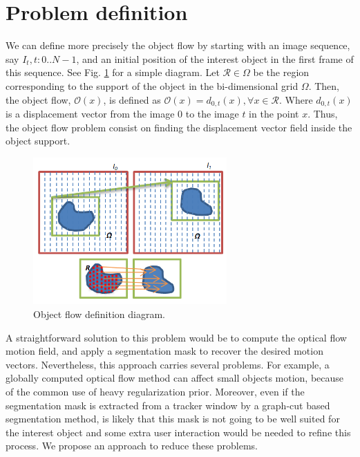 \section{Problem definition}

We can define more precisely the object flow by starting with an image sequence, say $I_t, t:0..N-1$, and an initial 
position of the interest object in the first frame of this sequence. See Fig. \ref{diagram} for a simple diagram. Let $\mathcal{R} \in \Omega$ be the region corresponding to the support of the object in the
bi-dimensional grid $\Omega$. Then, the object flow, $\mathcal{O}(x)$,  is defined as $\mathcal{O}(x) = d_{0,t}(x), \forall x \in \mathcal{R}$. 
Where $d_{0,t}(x)$ is a displacement vector from the image $0$ to 
the image $t$ in the point $x$. Thus, the object flow problem consist 
on finding the displacement vector field inside the object support.

   \begin{figure}[bhp]
      \centering
      \includegraphics[width=0.66\textwidth]{../images/diagram.png}
      \caption{ Object flow definition diagram. }
      \label{diagram}
   \end{figure}

A straightforward solution to this problem would be to compute the optical flow motion field, and apply 
a segmentation mask to recover the desired motion vectors. Nevertheless, this approach carries several 
problems. For example, a globally computed optical flow method can affect small objects motion, because of 
the common use of heavy regularization prior. Moreover, even if the segmentation mask is extracted from a 
tracker window by a graph-cut based segmentation method, is likely that this mask is not going to be well suited for the 
interest object and some extra user interaction would be needed to refine this process. We propose an approach 
to reduce these problems.

